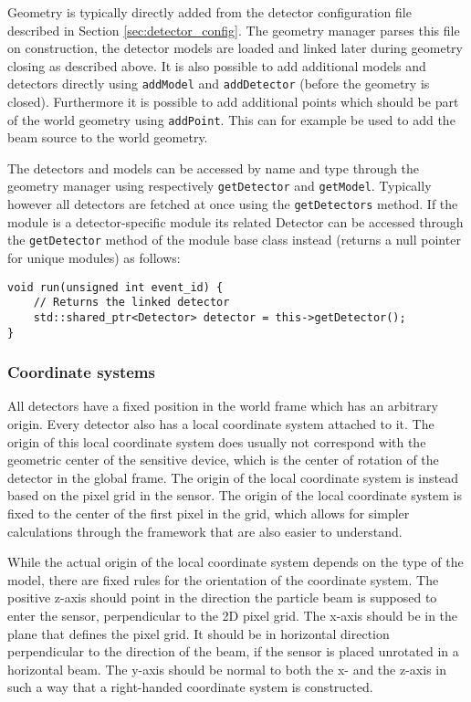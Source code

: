 Geometry is typically directly added from the detector configuration file described in Section \ref{sec:detector_config}. The geometry manager parses this file on construction, the detector models are loaded and linked later during geometry closing as described above. It is also possible to add additional models and detectors directly using \texttt{addModel} and \texttt{addDetector} (before the geometry is closed). Furthermore it is possible to add additional points which should be part of the world geometry using \texttt{addPoint}. This can for example be used to add the beam source to the world geometry.

The detectors and models can be accessed by name and type through the geometry manager using respectively \texttt{getDetector} and \texttt{getModel}. Typically however all detectors are fetched at once using the \texttt{getDetectors} method. If the module is a detector-specific module its related Detector can be accessed through the \texttt{getDetector} method of the module base class instead (returns a null pointer for unique modules) as follows:
\begin{verbatim}
void run(unsigned int event_id) {
    // Returns the linked detector
    std::shared_ptr<Detector> detector = this->getDetector();
}
\end{verbatim}

\subsubsection{Coordinate systems}
All detectors have a fixed position in the world frame which has an arbitrary origin. Every detector also has a local coordinate system attached to it. The origin of this local coordinate system does usually not correspond with the geometric center of the sensitive device, which is the center of rotation of the detector in the global frame. The origin of the local coordinate system is instead based on the pixel grid in the sensor. The origin of the local coordinate system is fixed to the center of the first pixel in the grid, which allows for simpler calculations through the framework that are also easier to understand. 

While the actual origin of the local coordinate system depends on the type of the model, there are fixed rules for the orientation of the coordinate system. The positive z-axis should point in the direction the particle beam is supposed to enter the sensor, perpendicular to the 2D pixel grid. The x-axis should be in the plane that defines the pixel grid. It should be in horizontal direction perpendicular to the direction of the beam, if the sensor is placed unrotated in a horizontal beam. The y-axis should be normal to both the x- and the z-axis in such a way that a right-handed coordinate system is constructed. 

